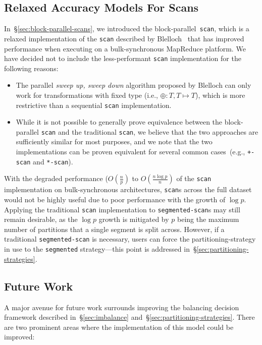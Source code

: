 \documentclass[preprint]{sigplanconf}
\theoremstyle{definition}
\begin{document}
\subsection{Relaxed Accuracy Models For Scans}
\label{sec:relaxed-scans}

In~\S\ref{sec:block-parallel-scans}, we introduced the block-parallel~\texttt{scan}, which is a relaxed
implementation of the \texttt{scan} described by Blelloch~\cite{blelloch93} that has improved
performance when executing on a bulk-synchronous MapReduce platform. We have decided not to
include the less-performant \texttt{scan} implementation for the following reasons:

\begin{itemize}
\item The parallel \emph{sweep up, sweep down} algorithm proposed by Blelloch can only work for
transformations with fixed type (i.e., $\oplus: T, T \mapsto T$), which is more restrictive than a
sequential \texttt{scan} implementation.
\item While it is not possible to generally prove equivalence between the block-parallel \texttt{scan} and
the traditional \texttt{scan}, we believe that the two approaches are sufficiently similar for most
purposes, and we note that the two implementations can be proven equivalent for several common
cases~(e.g., \texttt{+-scan} and \texttt{*-scan}).
\end{itemize}

With the degraded performance ($O(\frac{n}{p})$ to $O(\frac{n \log p}{n})$ of the \texttt{scan}
implementation on bulk-synchronous architectures, \texttt{scan}s across the full dataset would not be
highly useful due to poor performance with the growth of $\log p$. Applying the traditional \texttt{scan}
implementation to \texttt{segmented-scan}s may still remain desirable, as the $\log p$ growth is
mitigated by $p$ being the maximum number of partitions that a single segment is split across.
However, if a traditional \texttt{segmented-scan} is necessary, users can force the partitioning-strategy
in use to the \texttt{segmented} strategy---this point is addressed in~\S\ref{sec:partitioning-strategies}.

\subsection{Future Work}
\label{sec:future-work}

A major avenue for future work surrounds improving the balancing decision framework described
in~\S\ref{sec:imbalance} and~\S\ref{sec:partitioning-strategies}. There are two prominent areas where
the implementation of this model could be improved:
\end{document}

